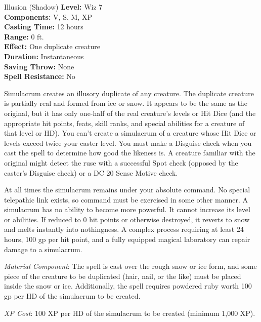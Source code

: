 {Illusion (Shadow)}
{
	\textbf{Level:}
	Wiz 7\\
	\textbf{Components:}
	V, S, M, XP\\
	\textbf{Casting Time:}
	12 hours\\
	\textbf{Range:}
	0 ft.\\
	\textbf{Effect:}
	One duplicate creature\\
	\textbf{Duration:}
	Instantaneous\\
	\textbf{Saving Throw:}
	None\\
	\textbf{Spell Resistance:}
	No\\
}
{
	Simulacrum creates an illusory duplicate of any creature. The duplicate creature is partially real and formed from ice or snow. It appears to be the same as the original, but it has only one-half of the real creature's levels or Hit Dice (and the appropriate hit points, feats, skill ranks, and special abilities for a creature of that level or HD). You can't create a simulacrum of a creature whose Hit Dice or levels exceed twice your caster level. You must make a Disguise check when you cast the spell to determine how good the likeness is. A creature familiar with the original might detect the ruse with a successful Spot check (opposed by the caster's Disguise check) or a DC 20 Sense Motive check.

	At all times the simulacrum remains under your absolute command. No special telepathic link exists, so command must be exercised in some other manner. A simulacrum has no ability to become more powerful. It cannot increase its level or abilities. If reduced to 0 hit points or otherwise destroyed, it reverts to snow and melts instantly into nothingness. A complex process requiring at least 24 hours, 100 gp per hit point, and a fully equipped magical laboratory can repair damage to a simulacrum.

	\textit{Material Component}:
	The spell is cast over the rough snow or ice form, and some piece of the creature to be duplicated (hair, nail, or the like) must be placed inside the snow or ice. Additionally, the spell requires powdered ruby worth 100 gp per HD of the simulacrum to be created.

	\textit{XP Cost}:
	100 XP per HD of the simulacrum to be created (minimum 1,000 XP).

}
